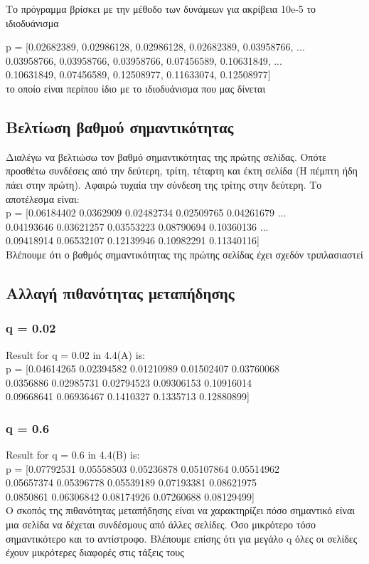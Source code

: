 \documentclass[a4paper,11pt]{article}
\newcommand{\lt}{\latintext}
\newcommand{\gt}{\greektext}
\begin{document}
\normalsize{Το πρόγραμμα βρίσκει με την μέθοδο των δυνάμεων για
ακρίβεια 10\lt e-5 \gt το ιδιοδυάνισμα 

\lt p = [0.02682389, 0.02986128, 0.02986128, 0.02682389, 0.03958766,
...\\
0.03958766, 0.03958766, 0.03958766, 0.07456589, 0.10631849, ...\\
0.10631849, 0.07456589, 0.12508977, 0.11633074, 0.12508977]
\\ 
\gt το οποίο είναι περίπου ίδιο με το ιδιοδυάνισμα που μας δίνεται}

	
	\subsection{Βελτίωση βαθμού σημαντικότητας}
\normalsize{Διαλέγω να βελτιώσω τον βαθμό σημαντικότητας της πρώτης
σελίδας. Οπότε προσθέτω συνδέσεις από την δεύτερη, τρίτη, τέταρτη και
έκτη σελίδα (Η πέμπτη ήδη πάει στην πρώτη). Αφαιρώ τυχαία την σύνδεση
της τρίτης στην δεύτερη. Το αποτέλεσμα είναι:
\\p = [0.06184402 0.0362909  0.02482734 0.02509765 0.04261679 ...
\\0.04193646 0.03621257 0.03553223 0.08790694 0.10360136  ...
\\0.09418914 0.06532107 0.12139946 0.10982291 0.11340116]
\\Βλέπουμε ότι ο βαθμός σημαντικότητας της πρώτης σελίδας έχει
σχεδόν τριπλασιαστεί}

	\subsection{Αλλαγή πιθανότητας μεταπήδησης}
		\subsubsection{\lt q = 0.02}
\normalsize{\lt Result for q = 0.02 in 4.4(A) is: \\
p = [0.04614265 0.02394582 0.01210989 0.01502407 0.03760068 
\\0.0356886 0.02985731 0.02794523 0.09306153 0.10916014 
\\0.09668641 0.06936467 0.1410327  0.1335713  0.12880899]}
		\subsubsection{\lt q = 0.6}
\normalsize{\lt Result for q = 0.6 in 4.4(B) is: \\
p = [0.07792531 0.05558503 0.05236878 0.05107864 0.05514962
\\ 0.05657374 0.05396778 0.05539189 0.07193381 0.08621975
\\ 0.0850861  0.06306842 0.08174926 0.07260688 0.08129499]}
\\
\normalsize{Ο σκοπός της πιθανότητας μεταπήδησης είναι να 
χαρακτηρίζει πόσο σημαντικό είναι μια σελίδα να δέχεται συνδέσμους
από άλλες σελίδες. Όσο μικρότερο τόσο σημαντικότερο και το
αντίστροφο. Βλέπουμε επίσης ότι για μεγάλο \lt q 
\gt όλες οι σελίδες έχουν
μικρότερες διαφορές στις τάξεις τους}
\end{document}
